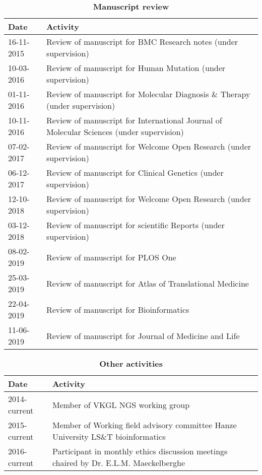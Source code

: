 \begin{appendices}
	\begin{table}
		\caption*{\textbf{Manuscript review}}
		\footnotesize
		\begin{tabulary}{\linewidth}{LL}
			Date & Activity \\
			\hline
			\rule{0pt}{2.5ex}\mbox{16-11-2015} & Review of manuscript for BMC Research notes (under supervision)\\
			\rule{0pt}{2.5ex}\mbox{10-03-2016} & Review of manuscript for Human Mutation (under supervision)\\
			\rule{0pt}{2.5ex}\mbox{01-11-2016} & Review of manuscript for Molecular Diagnosis \& Therapy (under supervision)\\
			\rule{0pt}{2.5ex}\mbox{10-11-2016} & Review of manuscript for International Journal of Molecular Sciences (under supervision)\\
			\rule{0pt}{2.5ex}\mbox{07-02-2017} & Review of manuscript for Welcome Open Research (under supervision)\\
			\rule{0pt}{2.5ex}\mbox{06-12-2017} & Review of manuscript for Clinical Genetics (under supervision)\\
			\rule{0pt}{2.5ex}\mbox{12-10-2018} & Review of manuscript for Welcome Open Research (under supervision)\\
			\rule{0pt}{2.5ex}\mbox{03-12-2018} & Review of manuscript for scientific Reports (under supervision)\\
			\rule{0pt}{2.5ex}\mbox{08-02-2019} & Review of manuscript for PLOS One\\
			\rule{0pt}{2.5ex}\mbox{25-03-2019} & Review of manuscript for Atlas of Translational Medicine\\
			\rule{0pt}{2.5ex}\mbox{22-04-2019} & Review of manuscript for Bioinformatics \\
			\rule{0pt}{2.5ex}\mbox{11-06-2019} & Review of manuscript for Journal of Medicine and Life\\
		\end{tabulary}
		\label{table:appendix_activities_5}
		\end{table}
			
			
	\begin{table}
		\caption*{\textbf{Other activities}}
		\footnotesize
		\begin{tabulary}{\linewidth}{LL}
			Date & Activity \\
			\hline	
			\rule{0pt}{2.5ex}\mbox{2014-current} & Member of VKGL NGS working group \\
			\rule{0pt}{2.5ex}\mbox{2015-current} & Member of Working field advisory committee Hanze University LS\&T bioinformatics \\
			\rule{0pt}{2.5ex}\mbox{2016-current} & Participant in monthly ethics discussion meetings chaired by Dr. E.L.M. Maeckelberghe \\
			\hline
		\end{tabulary}
		\label{table:appendix_activities_6}
	\end{table}


\end{appendices}
